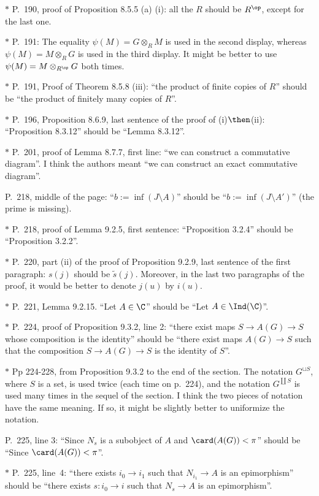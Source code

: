 \documentclass[12pt]{article}
\theoremstyle{remark}
\theoremstyle{definition}
\begin{document}
\nn$*$ P.~190, proof of Proposition 8.5.5 (a) (i): all the $R$ should be $R^{\op}$, except for the last one.

\nn$*$ P.~191: The equality $\psi(M)=G\otimes_RM$ is used in the second display, whereas $\psi(M)=M\otimes_RG$ is used in the third display. It might be better to use $\psi(M)=M\otimes_{R^{\op}}G$ both times. 

\nn$*$ P.~191, Proof of Theorem 8.5.8 (iii): ``the product of finite copies of $R$'' should be ``the product of finitely many copies of $R$''.

\nn$*$ P.~196, Proposition 8.6.9, last sentence of the proof of (i)$\then$(ii): ``Proposition 8.3.12'' should be ``Lemma 8.3.12''.

\nn$*$ P.~201, proof of Lemma 8.7.7, first line: ``we can construct a commutative diagram''. I think the authors meant ``we can construct an exact commutative diagram''.

\begin{s}
P.~218, middle of the page: ``$b:=\inf(J\setminus A)$'' should be ``$b:=\inf(J\setminus A')$'' (the prime is missing).
\end{s}

\nn$*$ P.~218, proof of Lemma 9.2.5, first sentence: ``Proposition 3.2.4'' should be ``Proposition 3.2.2''. 

\nn$*$ P.~220, part (ii) of the proof of Proposition 9.2.9, last sentence of the first paragraph: $s(j)$ should be $\tilde s(j)$. Moreover, in the last two paragraphs of the proof, it would be better to denote $j(u)$ by $i(u)$. 

\nn$*$ P.~221, Lemma 9.2.15. ``Let $A\in\C$'' should be ``Let $A\in\Ind(\C)$''.

\nn$*$ P.~224, proof of Proposition 9.3.2, line 2: ``there exist maps $S\to A(G)\to S$ whose composition is the identity'' should be ``there exist maps $A(G)\to S$ such that the composition $S\to A(G)\to S$ is the identity of $S$''.

\nn$*$ Pp 224-228, from Proposition 9.3.2 to the end of the section. The notation $G^{\sqcup S}$, where $S$ is a set, is used twice (each time on p.~224), and the notation $G^{\coprod S}$ is used many times in the sequel of the section. I think the two pieces of notation have the same meaning. If so, it might be slightly better to uniformize the notation.

\begin{s}
P.~225, line 3: ``Since $N_s$ is a subobject of $A$ and $\card(A(G))<\pi$'' should be ``Since $\card(A(G))<\pi$''.

\nn$*$ P.~225, line~4: ``there exists $i_0\to i_1$ such that $N_{i_1}\to A$ is an epimorphism'' should be ``there exists $s:i_0\to i$ such that $N_s\to A$ is an epimorphism''.
\end{s}
\end{document}
